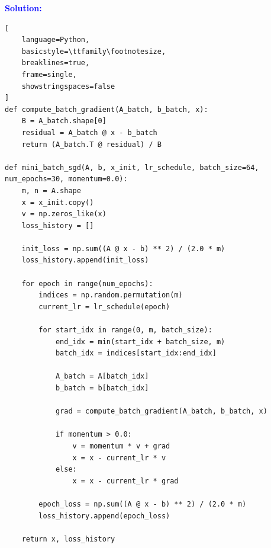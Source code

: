 \documentclass[11pt,a4paper]{article}
\newcommand{\solution}{\par\medskip
    \textcolor{blue}{\textbf{Solution:}}\par\smallskip}
\begin{document}
\solution

\begin{lstlisting}[
    language=Python,
    basicstyle=\ttfamily\footnotesize,
    breaklines=true,
    frame=single,
    showstringspaces=false
]
def compute_batch_gradient(A_batch, b_batch, x):
    B = A_batch.shape[0]
    residual = A_batch @ x - b_batch
    return (A_batch.T @ residual) / B

def mini_batch_sgd(A, b, x_init, lr_schedule, batch_size=64, num_epochs=30, momentum=0.0):
    m, n = A.shape
    x = x_init.copy()
    v = np.zeros_like(x)
    loss_history = []
    
    init_loss = np.sum((A @ x - b) ** 2) / (2.0 * m)
    loss_history.append(init_loss)
    
    for epoch in range(num_epochs):
        indices = np.random.permutation(m)
        current_lr = lr_schedule(epoch)
        
        for start_idx in range(0, m, batch_size):
            end_idx = min(start_idx + batch_size, m)
            batch_idx = indices[start_idx:end_idx]
            
            A_batch = A[batch_idx]
            b_batch = b[batch_idx]
            
            grad = compute_batch_gradient(A_batch, b_batch, x)
            
            if momentum > 0.0:
                v = momentum * v + grad
                x = x - current_lr * v
            else:
                x = x - current_lr * grad
                
        epoch_loss = np.sum((A @ x - b) ** 2) / (2.0 * m)
        loss_history.append(epoch_loss)
        
    return x, loss_history
\end{lstlisting}
\end{document}
